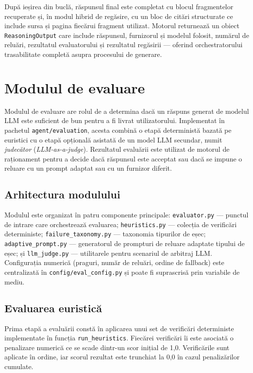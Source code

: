 \documentclass[12pt, a4paper, oneside, romanian]{teza-upb}
\begin{document}
După ieșirea din buclă, răspunsul final este completat cu blocul fragmentelor recuperate și, în modul hibrid de regăsire, cu un bloc de citări structurate ce include sursa și pagina fiecărui fragment utilizat. Motorul returnează un obiect \texttt{ReasoningOutput} care include răspunsul, furnizorul și modelul folosit, numărul de reluări, rezultatul evaluatorului și rezultatul regăsirii — oferind orchestratorului trasabilitate completă asupra procesului de generare.

\section{Modulul de evaluare}
\label{sec:evaluare}

Modulul de evaluare are rolul de a determina dacă un răspuns generat de modelul LLM este suficient de bun pentru a fi livrat utilizatorului. Implementat în pachetul \texttt{agent/evaluation}, acesta combină o etapă deterministă bazată pe euristici cu o etapă opțională asistată de un model LLM secundar, numit \textit{judecător} (\textit{LLM-as-a-judge}). Rezultatul evaluării este utilizat de motorul de raționament pentru a decide dacă răspunsul este acceptat sau dacă se impune o reluare cu un prompt adaptat sau cu un furnizor diferit.

\subsection{Arhitectura modulului}

Modulul este organizat în patru componente principale: \texttt{evaluator.py} — punctul de intrare care orchestrează evaluarea; \texttt{heuristics.py} — colecția de verificări deterministe; \texttt{failure\_taxonomy.py} — taxonomia tipurilor de eșec; \texttt{adaptive\_prompt.py} — generatorul de prompturi de reluare adaptate tipului de eșec; și \texttt{llm\_judge.py} — utilitarele pentru scenariul de arbitraj LLM. Configurația numerică (praguri, număr de reluări, ordine de fallback) este centralizată în \texttt{config/eval\_config.py} și poate fi suprascrisă prin variabile de mediu.

\subsection{Evaluarea euristică}

Prima etapă a evaluării constă în aplicarea unui set de verificări deterministe implementate în funcția \texttt{run\_heuristics}. Fiecărei verificări îi este asociată o penalizare numerică ce se scade dintr-un scor inițial de 1,0. Verificările sunt aplicate în ordine, iar scorul rezultat este trunchiat la 0,0 în cazul penalizărilor cumulate.
\end{document}
